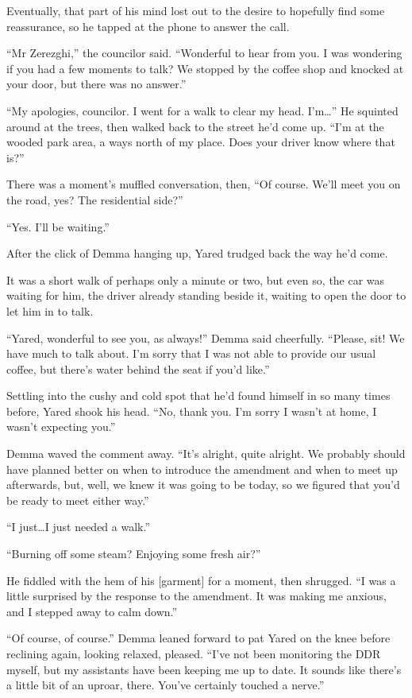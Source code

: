 Eventually, that part of his mind lost out to the desire to hopefully find some reassurance, so he tapped at the phone to answer the call.

``Mr Zerezghi,'' the councilor said. ``Wonderful to hear from you. I was wondering if you had a few moments to talk? We stopped by the coffee shop and knocked at your door, but there was no answer.''

``My apologies, councilor. I went for a walk to clear my head. I'm\ldots{}'' He squinted around at the trees, then walked back to the street he'd come up. ``I'm at the wooded park area, a ways north of my place. Does your driver know where that is?''

There was a moment's muffled conversation, then, ``Of course. We'll meet you on the road, yes? The residential side?''

``Yes. I'll be waiting.''

After the click of Demma hanging up, Yared trudged back the way he'd come.

It was a short walk of perhaps only a minute or two, but even so, the car was waiting for him, the driver already standing beside it, waiting to open the door to let him in to talk.

``Yared, wonderful to see you, as always!'' Demma said cheerfully. ``Please, sit! We have much to talk about. I'm sorry that I was not able to provide our usual coffee, but there's water behind the seat if you'd like.''

Settling into the cushy and cold spot that he'd found himself in so many times before, Yared shook his head. ``No, thank you. I'm sorry I wasn't at home, I wasn't expecting you.''

Demma waved the comment away. ``It's alright, quite alright. We probably should have planned better on when to introduce the amendment and when to meet up afterwards, but, well, we knew it was going to be today, so we figured that you'd be ready to meet either way.''

``I just\ldots I just needed a walk.''

``Burning off some steam? Enjoying some fresh air?''

He fiddled with the hem of his {[}garment{]} for a moment, then shrugged. ``I was a little surprised by the response to the amendment. It was making me anxious, and I stepped away to calm down.''

``Of course, of course.'' Demma leaned forward to pat Yared on the knee before reclining again, looking relaxed, pleased. ``I've not been monitoring the DDR myself, but my assistants have been keeping me up to date. It sounds like there's a little bit of an uproar, there. You've certainly touched a nerve.''

